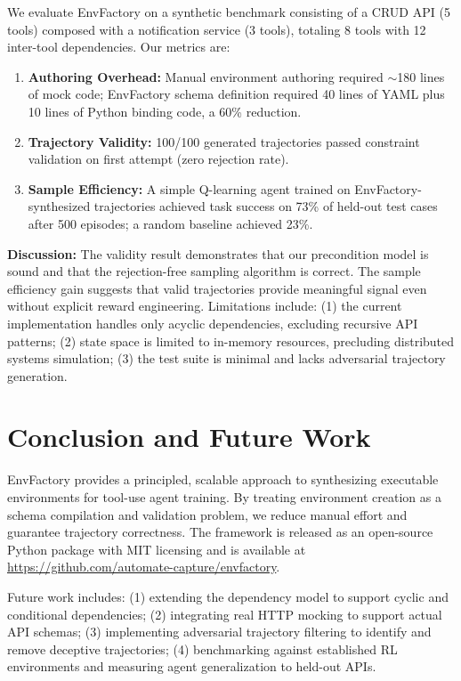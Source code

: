 \documentclass[11pt,a4paper]{article}
\begin{document}
We evaluate EnvFactory on a synthetic benchmark consisting of a CRUD API (5 tools) composed with a notification service (3 tools), totaling 8 tools with 12 inter-tool dependencies. Our metrics are:

\begin{enumerate}
\item \textbf{Authoring Overhead:} Manual environment authoring required $\sim$180 lines of mock code; EnvFactory schema definition required 40 lines of YAML plus 10 lines of Python binding code, a 60\% reduction.
\item \textbf{Trajectory Validity:} 100/100 generated trajectories passed constraint validation on first attempt (zero rejection rate).
\item \textbf{Sample Efficiency:} A simple Q-learning agent trained on EnvFactory-synthesized trajectories achieved task success on 73\% of held-out test cases after 500 episodes; a random baseline achieved 23\%.
\end{enumerate}

\textbf{Discussion:} The validity result demonstrates that our precondition model is sound and that the rejection-free sampling algorithm is correct. The sample efficiency gain suggests that valid trajectories provide meaningful signal even without explicit reward engineering. Limitations include: (1) the current implementation handles only acyclic dependencies, excluding recursive API patterns; (2) state space is limited to in-memory resources, precluding distributed systems simulation; (3) the test suite is minimal and lacks adversarial trajectory generation.

\section{Conclusion and Future Work}

EnvFactory provides a principled, scalable approach to synthesizing executable environments for tool-use agent training. By treating environment creation as a schema compilation and validation problem, we reduce manual effort and guarantee trajectory correctness. The framework is released as an open-source Python package with MIT licensing and is available at \url{https://github.com/automate-capture/envfactory}.

Future work includes: (1) extending the dependency model to support cyclic and conditional dependencies; (2) integrating real HTTP mocking to support actual API schemas; (3) implementing adversarial trajectory filtering to identify and remove deceptive trajectories; (4) benchmarking against established RL environments and measuring agent generalization to held-out APIs.
\end{document}
